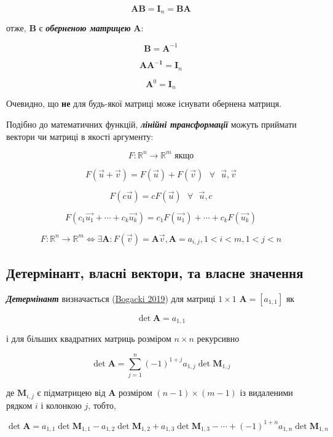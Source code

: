 \documentclass[
  11pt,
]{book}
\begin{document}
\[\mathbf{AB} = \mathbf{I}_n = \mathbf{BA}\]

отже, \(\mathbf{B}\) є \textbf{\emph{оберненою матрицею}}
\(\mathbf{A}\):

\[\mathbf{B} = \mathbf{A}^{-1}\]

\[\mathbf{AA^{-1}} = \mathbf{I}_n\]

\[\mathbf{A}^0 = \mathbf{I}_n\]

Очевидно, що \textbf{не} для будь-якої матриці може існувати обернена
матриця.

Подібно до математичних функцій, \textbf{\emph{лінійні трансформації}}
можуть приймати вектори чи матриці в якості аргументу:

\[F: \mathbb{R}^n \rightarrow \mathbb{R}^m \text{ якщо}\]

\[F(\vec{u} + \vec{v}) = F(\vec{u}) + F(\vec{v}) \text{ } \forall \text{ } \vec{u}, \vec{v}\]

\[F(c \vec{u}) = c F(\vec{u}) \text{ } \forall \text{ } \vec{u}, c\]

\[F(c_1 \vec{u_1} + \cdots + c_k \vec{u_k}) = c_1 F(\vec{u_1}) + \cdots + c_k F(\vec{u_k})\]

\[F: \mathbb{R}^n \rightarrow \mathbb{R}^m \iff \exists \mathbf{A}: F(\vec{v}) = \mathbf{A} \vec{v}, \mathbf{A} = a_{i, j}, 1 < i<m, 1 < j < n\]

\subsection{Детермінант, власні вектори, та власне
значення}\label{ux434ux435ux442ux435ux440ux43cux456ux43dux430ux43dux442-ux432ux43bux430ux441ux43dux456-ux432ux435ux43aux442ux43eux440ux438-ux442ux430-ux432ux43bux430ux441ux43dux435-ux437ux43dux430ux447ux435ux43dux43dux44f}

\textbf{\emph{Детермінант}} визначається
(\href{https://books.google.com/books/about/Linear_Algebra.html?id=P8BZzAEACAAJ}{Bogacki
2019}) для матриці \(1 \times 1\) \(\mathbf{A} = [a_{1, 1}]\) як

\[\det \mathbf{A} = a_{1, 1}\]

і для більших квадратних матриць розміром \(n \times n\) рекурсивно

\[\det \mathbf{A} = \sum \limits_{j=1}^n (-1)^{1+j} a_{1, j} \det \mathbf{M}_{1,j}\]

де \(\mathbf{M}_{i,j}\) є підматрицею від \(\mathbf{A}\) розміром
\((n - 1) \times (m - 1)\) із видаленими рядком \(i\) і колонкою \(j\),
тобто,

\[\det \mathbf{A} = a_{1,1} \det \mathbf{M}_{1,1} - a_{1,2} \det \mathbf{M}_{1,2} + a_{1,3} \det \mathbf{M}_{1,3} - \cdots + (-1)^{1+n} a_{1, n} \det \mathbf{M}_{1,n}\]
\end{document}
